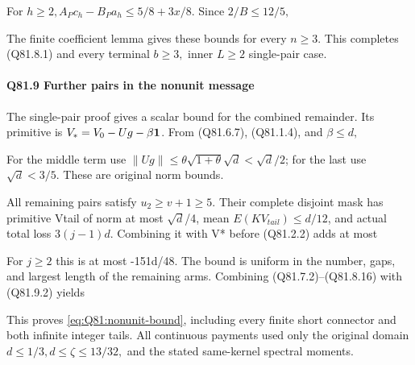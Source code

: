 For \(h\ge 2,\allowbreak  A_Pc_h-B_Pa_h\le5/8+3x/8\). Since \(2/B\le 12/5,\allowbreak \)


The finite coefficient lemma gives these bounds for every \(n\ge 3\). This completes
(Q81.8.1) and every terminal \(b\ge 3,\allowbreak \) inner \(L\ge 2\) single-pair case.

\paragraph{Q81.9 Further pairs in the nonunit message}

The single-pair proof gives a scalar bound for the combined remainder. Its primitive is
\(V_*=V_0-Ug-\beta\mathbf1\). From (Q81.6.7), (Q81.1.4), and \(\beta\le d,\allowbreak \)


For the middle term use
\(\|Ug\|\le\theta\sqrt{1+\theta}\sqrt d<\sqrt d/2\);
for the last use \(\sqrt d<3/5\). These are original norm bounds.

All remaining pairs satisfy \(u_2\ge v+1\ge5\). Their complete
disjoint mask has primitive Vtail of norm at most \(\sqrt{d}\)/4, mean
\(E(KV_{tail})\le d/12\), and actual total loss \(3(j-1)d\).
Combining it with V* before (Q81.2.2) adds at most


For \(j\ge 2\) this is at most -151d/48. The bound is uniform in the number, gaps, and largest length of the remaining arms. Combining (Q81.7.2)--(Q81.8.16) with (Q81.9.2) yields


This proves \eqref{eq:Q81:nonunit-bound}, including every finite short connector and
both infinite integer tails. All continuous payments used only the
original domain \(d\le 1/3,\allowbreak  d\le \zeta\le 13/32,\allowbreak \) and the stated same-kernel
spectral moments. 

